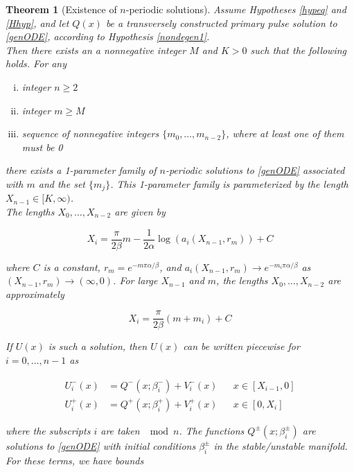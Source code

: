 \documentclass[12pt]{article}
\newtheorem{theorem}{Theorem}
\begin{document}
\begin{theorem}[Existence of $n$-periodic solutions]\label{perexist}
Assume Hypotheses \ref{hypeq} and \ref{Hhyp}, and let $Q(x)$ be a transversely constructed primary pulse solution to \eqref{genODE}, according to Hypothesis \ref{nondegen1}.\\

Then there exists an a nonnegative integer $M$ and $K > 0$ such that the following holds. For any 
\begin{enumerate}[(i)]
\item integer $n \geq 2$ \\
\item integer $m \geq M$ \\
\item sequence of nonnegative integers $\{ m_0, \dots, m_{n-2} \}$, where at least one of them must be 0
\end{enumerate}

there exists a 1-parameter family of $n$-periodic solutions to \eqref{genODE} associated with $m$ and the set $\{ m_j \}$. This 1-parameter family is parameterized by the length $X_{n-1} \in [K, \infty)$.\\

The lengths $X_0, \dots, X_{n-2}$ are given by

\begin{equation}\label{Xi}
X_i = \frac{\pi}{2 \beta}m 
- \frac{1}{2 \alpha} \log(a_i(X_{n-1}, r_m)) + C
\end{equation}

where $C$ is a constant, $r_m = e^{-m \pi \alpha/\beta}$, and $a_i(X_{n-1}, r_m) \rightarrow e^{-m_i \pi \alpha/ \beta}$ as $(X_{n-1}, r_m) \rightarrow (\infty, 0)$. For large $X_{n-1}$ and $m$, the lengths $X_0, \dots, X_{n-2}$ are approximately

\begin{equation}\label{Xiapprox}
X_i = \frac{\pi}{2 \beta}(m + m_i) + C
\end{equation}

If $U(x)$ is such a solution, then $U(x)$ can be written piecewise for $i = 0, \dots, n-1$ as 

\begin{align}
U_i^-(x) &= Q^-(x; \beta_i^-) + V_i^-(x) && x \in [X_{i-1}, 0] \\
U_i^+(x) &= Q^+(x; \beta_i^+) + V_i^+(x) && x \in [0, X_i]
\end{align}

where the subscripts $i$ are taken $\mod n$. The functions $Q^\pm(x; \beta_i^\pm)$ are solutions to \eqref{genODE} with initial conditions $\beta_i^\pm$ in the stable/unstable manifold. For these terms, we have bounds


\end{theorem}
\end{document}
